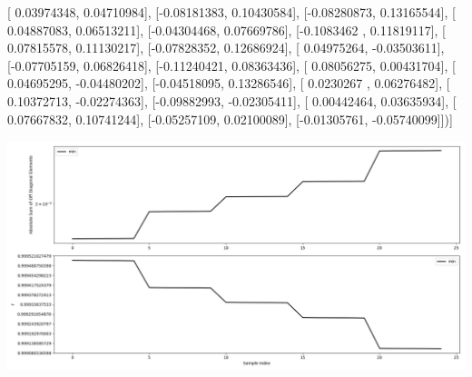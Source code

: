 \documentclass{article}
\begin{document}
       [ 0.03974348,  0.04710984],
       [-0.08181383,  0.10430584],
       [-0.08280873,  0.13165544],
       [ 0.04887083,  0.06513211],
       [-0.04304468,  0.07669786],
       [-0.1083462 ,  0.11819117],
       [ 0.07815578,  0.11130217],
       [-0.07828352,  0.12686924],
       [ 0.04975264, -0.03503611],
       [-0.07705159,  0.06826418],
       [-0.11240421,  0.08363436],
       [ 0.08056275,  0.00431704],
       [ 0.04695295, -0.04480202],
       [-0.04518095,  0.13286546],
       [ 0.0230267 ,  0.06276482],
       [ 0.10372713, -0.02274363],
       [-0.09882993, -0.02305411],
       [ 0.00442464,  0.03635934],
       [ 0.07667832,  0.10741244],
       [-0.05257109,  0.02100089],
       [-0.01305761, -0.05740099]])]
\begin{center}
\includegraphics[scale=.9]{report_pickled_controls192/control_dpn_all.png}

\end{center}
\end{document}
